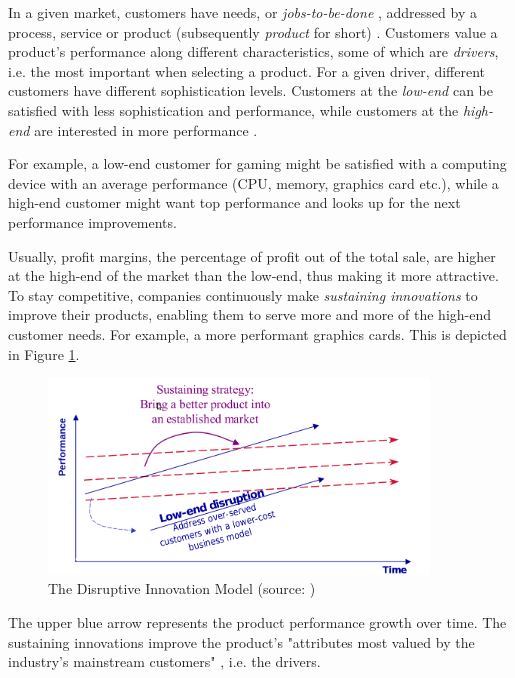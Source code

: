 \documentclass[a4paper,10pt]{book}
\begin{document}
In a given market, customers have needs, or \emph{jobs-to-be-done} \cite{DisruptingClassExpandedEdition},
addressed by a process, service or product (subsequently \emph{product} for short) \cite{scientificArticlePredictingTheUnpredictable}.
Customers value a product's performance along different characteristics, some of which are \emph{drivers}, i.e. 
the most important when selecting a product. For a given driver, different customers have different sophistication levels. 
Customers at the \emph{low-end} can be satisfied with 
less sophistication and performance, while customers at the \emph{high-end} are interested in more performance \cite{innovatorsSolution}. 

For example, a low-end customer for gaming might be satisfied with a computing device with an average performance (CPU, memory, graphics card etc.), 
while a high-end customer might want top performance and looks up for the next performance improvements.

Usually, profit margins, the percentage of profit out of the total sale, are higher at the high-end of the market than the low-end, thus 
making it more attractive.
To stay competitive, companies continuously make \emph{sustaining innovations} to improve their products, enabling them to serve more and more of 
the high-end customer needs. For example, a more performant graphics cards. This is depicted in Figure \ref{fig:disruptiveInnovationModel}.\\

\begin{figure}[here]
\includegraphics[width=0.9\textwidth]{images/simpleDisruptiveInnovationModel.png}
 \caption{The Disruptive Innovation Model (source: \cite{innovatorsSolution})}
\label{fig:disruptiveInnovationModel}
\end{figure}

The upper blue arrow represents the product performance growth over time. The sustaining innovations improve 
the product's "attributes most valued by the industry's mainstream customers" \cite{innovatorsSolution}, i.e. the drivers. 
\end{document}
